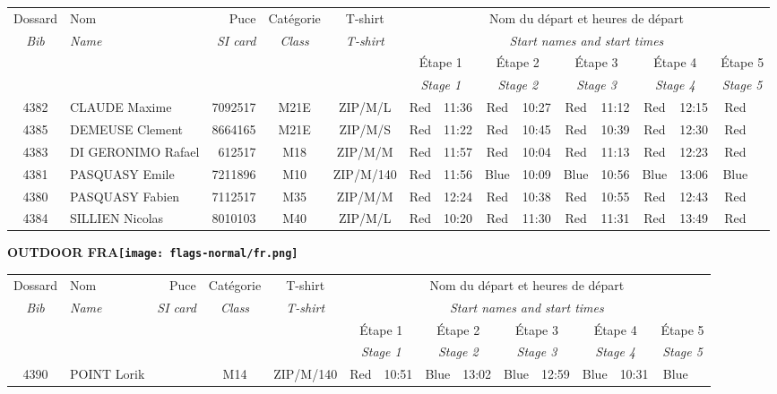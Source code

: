 \documentclass{report}
\begin{document}
  \begin{longtable}{|c|l|r|c|c|*{5}{cc|}}
    Dossard & Nom  & Puce    & Catégorie & T-shirt & \multicolumn{10}{c|}{Nom du départ et heures de départ} \\
    \itshape Bib     & \itshape Name & \itshape SI card & \itshape Class  & \itshape  T-shirt  & \multicolumn{10}{c|}{\itshape Start names and start times} \\
    \hline
    & & & & & \multicolumn{2}{c|}{Étape 1} & \multicolumn{2}{c|}{Étape 2} & \multicolumn{2}{c|}{Étape 3} & \multicolumn{2}{c|}{Étape 4} & \multicolumn{2}{c|}{Étape 5} \\
    & & & & & \multicolumn{2}{c|}{\itshape Stage 1} & \multicolumn{2}{c|}{\itshape Stage 2} & \multicolumn{2}{c|}{\itshape Stage 3} & \multicolumn{2}{c|}{\itshape Stage 4} & \multicolumn{2}{c|}{\itshape Stage 5} \\
    \hline
    4382 & CLAUDE Maxime & 7092517 & M21E & ZIP/M/L & Red & 11:36 & Red & 10:27 & Red & 11:12 & Red & 12:15 & Red &  \\
    4385 & DEMEUSE Clement & 8664165 & M21E & ZIP/M/S & Red & 11:22 & Red & 10:45 & Red & 10:39 & Red & 12:30 & Red &  \\
    4383 & DI GERONIMO Rafael & 612517 & M18 & ZIP/M/M & Red & 11:57 & Red & 10:04 & Red & 11:13 & Red & 12:23 & Red &  \\
    4381 & PASQUASY Emile & 7211896 & M10 & ZIP/M/140 & Red & 11:56 & Blue & 10:09 & Blue & 10:56 & Blue & 13:06 & Blue &  \\
    4380 & PASQUASY Fabien & 7112517 & M35 & ZIP/M/M & Red & 12:24 & Red & 10:38 & Red & 10:55 & Red & 12:43 & Red &  \\
    4384 & SILLIEN Nicolas & 8010103 & M40 & ZIP/M/L & Red & 10:20 & Red & 11:30 & Red & 11:31 & Red & 13:49 & Red &  \\
  \end{longtable}
\newpage
  \Huge \centering \bfseries OUTDOOR  FRA\normalfont \footnotesize \sffamily \hfill \texttt{[image: flags-normal/fr.png]} \newline 
  \begin{longtable}{|c|l|r|c|c|*{5}{cc|}}
    Dossard & Nom  & Puce    & Catégorie & T-shirt & \multicolumn{10}{c|}{Nom du départ et heures de départ} \\
    \itshape Bib     & \itshape Name & \itshape SI card & \itshape Class  & \itshape  T-shirt  & \multicolumn{10}{c|}{\itshape Start names and start times} \\
    \hline
    & & & & & \multicolumn{2}{c|}{Étape 1} & \multicolumn{2}{c|}{Étape 2} & \multicolumn{2}{c|}{Étape 3} & \multicolumn{2}{c|}{Étape 4} & \multicolumn{2}{c|}{Étape 5} \\
    & & & & & \multicolumn{2}{c|}{\itshape Stage 1} & \multicolumn{2}{c|}{\itshape Stage 2} & \multicolumn{2}{c|}{\itshape Stage 3} & \multicolumn{2}{c|}{\itshape Stage 4} & \multicolumn{2}{c|}{\itshape Stage 5} \\
    \hline
    4390 & POINT Lorik &  & M14 & ZIP/M/140 & Red & 10:51 & Blue & 13:02 & Blue & 12:59 & Blue & 10:31 & Blue &  \\
  \end{longtable}
\end{document}
